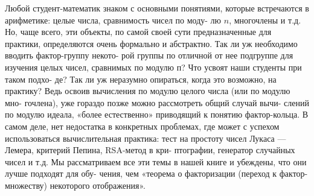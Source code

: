 {{\pagebreak
\restoretop
{}
   Любой студент-математик знаком с основными понятиями, которые\linebreak
встречаются в арифметике: целые числа, сравнимость чисел по моду-\linebreak
лю $n$, многочлены и т.д. Но, чаще всего, эти объекты, по самой своей\linebreak
сути предназначенные для практики, определяются очень формально\linebreak
и абстрактно. Так ли уж необходимо вводить фактор-группу некото-\linebreak
рой группы по отличной от нее подгруппе для изучения целых чисел,\linebreak
сравнимых по модулю п? Что усвоят наши студенты при таком подхо-\linebreak
де? Так ли уж неразумно опираться, когда это возможно, на практику?\linebreak
Ведь освоив вычисления по модулю целого числа (или по модулю мно-\linebreak
гочлена), уже гораздо позже можно рассмотреть общий случай вычи-\linebreak
слений по модулю идеала, «более естественно» приводящий к понятию\linebreak
фактор-кольца. В самом деле, нет недостатка в конкретных проблемах,\linebreak
где может с успехом использоваться вычислительная практика: тест на\linebreak
простоту чисел Лукаса — Лемера, критерий Пепина, RSA-метод в кри-\linebreak
птографии, генератор случайных чисел и т.д. Мы рассматриваем все\linebreak
эти темы в нашей книге и убеждены, что они лучше подходят для обу-\linebreak
чения, чем «теорема о факторизации (переход к фактор-множеству)\linebreak
некоторого отображения».

}}
